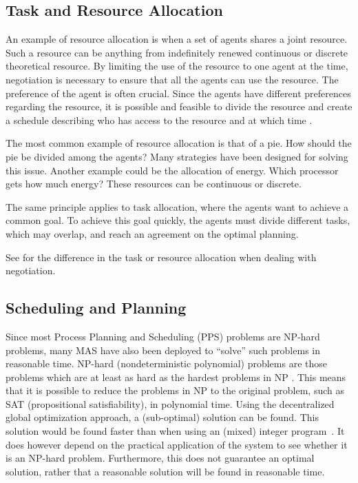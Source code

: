 \subsection{Task and Resource Allocation}
An example of resource allocation is when a set of agents shares a joint resource. Such a resource can be anything from indefinitely renewed continuous or discrete theoretical resource. By limiting the use of the resource to one agent at the time, negotiation is necessary to ensure that all the agents can use the resource. The preference of the agent is often crucial. Since the agents have different preferences regarding the resource, it is possible and feasible to divide the resource and create a schedule describing who has access to the resource and at which time \citep{fatima2014principles}. 

The most common example of resource allocation is that of a pie. How should the pie be divided among the agents? Many strategies have been designed for solving this issue. Another example could be the allocation of energy. Which processor gets how much energy? These resources can be continuous or discrete.

The same principle applies to task allocation, where the agents want to achieve a common goal. To achieve this goal quickly, the agents must divide different tasks, which may overlap, and reach an agreement on the optimal planning. 

See  for the difference  in the task or resource allocation when dealing with negotiation.

\subsection{Scheduling and Planning}
Since most Process Planning and Scheduling (PPS) problems are NP-hard problems, many MAS have also been deployed to ``solve'' such problems in reasonable time. NP-hard (nondeterministic polynomial) problems are those problems which are at least as hard as the hardest problems in NP \citep{hromkovivc2013algorithmics}. This means that it is possible to reduce the problems in NP to the original problem, such as SAT (propositional satisfiability), in polynomial time. Using the decentralized global optimization approach, a (sub-optimal) solution can be found. This solution would be found faster than when using an (mixed) integer program~\citep{feng2014multi}. It does however depend on the practical application of the system to see whether it is an NP-hard problem. Furthermore, this  does not guarantee an optimal solution, rather that a reasonable solution will be found in reasonable time.

